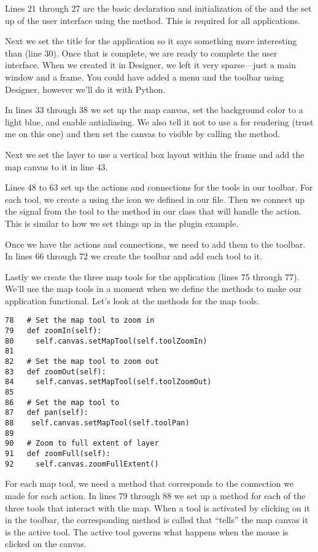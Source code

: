 Lines 21 through 27 are the basic declaration and initialization of the 
 and the set up of the user interface using the 
 method. This is required for all applications.

Next we set the title for the application so it says something more
interesting than  (line 30). Once that is
complete, we are ready to complete the user interface. When we created it in
Designer, we left it very sparse---just a main window and a frame. You could
have added a menu and the toolbar using Designer, however we'll do it with
Python.

In lines 33 through 38 we set up the map
canvas, set the background color to a light blue, and enable antialiasing.
We also tell it not to use a  for rendering (trust me on this one) 
and then set the canvas to visible by calling the  method.

Next we set the layer to use a vertical box layout within the frame and add the 
map canvas to it in line 43.

Lines 48 to 63 set up the actions and connections for the tools in our 
toolbar. For each tool, we create a
 using the icon we defined in our  file. 
Then we
connect up the  signal from the tool to the method in our
class that will handle the action. This is similar to how we set things up
in the plugin example.

Once we have the actions and connections, we need to add them to the
toolbar. In lines 66 through 72 we create the
toolbar and add each tool to it.

Lastly we create the three map tools for the application (lines
75 through 77). We'll use the map tools in a
moment when we define the methods to make our application functional. Let's
look at the methods for the map tools.

\begin{verbatim}
78   # Set the map tool to zoom in
79   def zoomIn(self):
80     self.canvas.setMapTool(self.toolZoomIn)
81 
82   # Set the map tool to zoom out
83   def zoomOut(self):
84     self.canvas.setMapTool(self.toolZoomOut)
85 
86   # Set the map tool to 
87   def pan(self):
88    self.canvas.setMapTool(self.toolPan)
89 
90   # Zoom to full extent of layer
91   def zoomFull(self):
92     self.canvas.zoomFullExtent()
\end{verbatim}

For each map tool, we need a method that corresponds to the connection we
made for each action. In lines 79 through 88 we set up a method for each 
of the three tools that
interact with the map. When a tool is activated by clicking on it in the
toolbar, the corresponding method is called that ``tells'' the map canvas it
is the active tool. The active tool governs what happens when the mouse is
clicked on the canvas.

